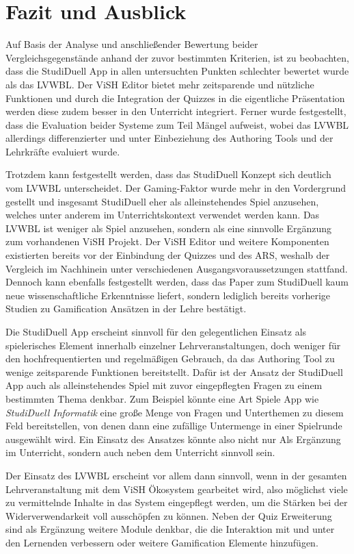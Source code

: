 \documentclass[conference]{IEEEtran}
\begin{document}
\section{Fazit und Ausblick}
Auf Basis der Analyse und anschließender Bewertung beider Vergleichsgegenstände anhand der zuvor bestimmten Kriterien, ist zu beobachten, dass die StudiDuell App in allen untersuchten Punkten schlechter bewertet wurde als das LVWBL. Der ViSH Editor bietet mehr zeitsparende und nützliche Funktionen und durch die Integration der Quizzes in die eigentliche Präsentation werden diese zudem besser in den Unterricht integriert. Ferner wurde festgestellt, dass die Evaluation beider Systeme zum Teil Mängel aufweist, wobei das LVWBL allerdings differenzierter und unter Einbeziehung des Authoring Tools und der Lehrkräfte evaluiert wurde. 

Trotzdem kann festgestellt werden, dass das StudiDuell Konzept sich deutlich vom LVWBL unterscheidet. Der Gaming-Faktor wurde mehr in den Vordergrund gestellt und insgesamt StudiDuell eher als alleinstehendes Spiel anzusehen, welches unter anderem im Unterrichtskontext verwendet werden kann. Das LVWBL ist weniger als Spiel anzusehen, sondern als eine sinnvolle Ergänzung zum vorhandenen ViSH Projekt. Der ViSH Editor und weitere Komponenten existierten bereits vor der Einbindung der Quizzes und des ARS, weshalb der Vergleich im Nachhinein unter verschiedenen Ausgangsvoraussetzungen stattfand. Dennoch kann ebenfalls festgestellt werden, dass das Paper zum StudiDuell kaum neue wissenschaftliche Erkenntnisse liefert, sondern lediglich bereits vorherige Studien zu Gamification Ansätzen in der Lehre bestätigt.

Die StudiDuell App erscheint sinnvoll für den gelegentlichen Einsatz als spielerisches Element innerhalb einzelner Lehrveranstaltungen, doch weniger für den hochfrequentierten und regelmäßigen Gebrauch, da das Authoring Tool zu wenige zeitsparende Funktionen bereitstellt. Dafür ist der Ansatz der StudiDuell App auch als alleinstehendes Spiel mit zuvor eingepflegten Fragen zu einem bestimmten Thema denkbar. Zum Beispiel könnte eine Art Spiele App wie \emph{StudiDuell Informatik} eine große Menge von Fragen und Unterthemen zu diesem Feld bereitstellen, von denen dann eine zufällige Untermenge in einer Spielrunde ausgewählt wird. Ein Einsatz des Ansatzes könnte also nicht nur Als Ergänzung im Unterricht, sondern auch neben dem Unterricht sinnvoll sein.

Der Einsatz des LVWBL erscheint vor allem dann sinnvoll, wenn in der gesamten Lehrveranstaltung mit dem ViSH Ökosystem  gearbeitet wird, also möglichst viele zu vermittelnde Inhalte in das System eingepflegt werden, um die Stärken bei der Widerverwendarkeit voll ausschöpfen zu können. Neben der Quiz Erweiterung sind als Ergänzung weitere Module denkbar, die die Interaktion mit und unter den Lernenden verbessern oder weitere Gamification Elemente hinzufügen.
\end{document}
